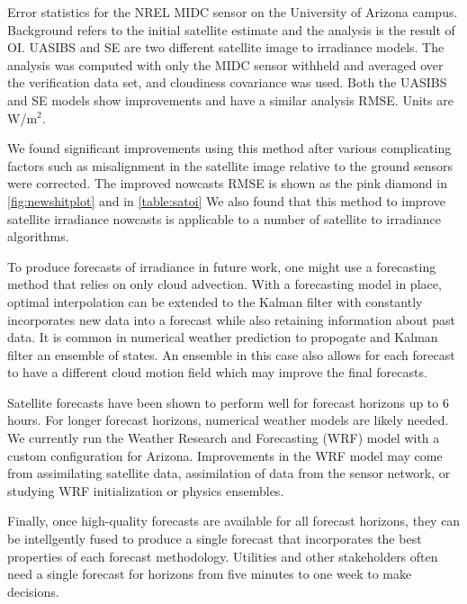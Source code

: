 \begin{table}[htbp]
  \caption[Optimal interpolation error metrics]{
    Error statistics for the NREL MIDC sensor on the University
    of Arizona campus. Background refers to the initial satellite
    estimate and the analysis is the result of OI. UASIBS and SE are
    two different satellite image to irradiance models.
    The analysis was computed with only the MIDC
    sensor withheld and averaged over the verification data set, and
    cloudiness covariance was used. Both the
    UASIBS and SE models show improvements and have a similar
    analysis RMSE\@. Units are W/m$^2$.}
\label{table:satoi}
\vspace{0.5em}

\centering
\end{table}


We found significant improvements using this method after various
complicating factors such as misalignment in the satellite image
relative to the ground sensors were corrected.
The improved nowcasts RMSE is shown as the pink diamond in
\cref{fig:newshitplot} and in \cref{table:satoi}
We also found that this method to improve satellite irradiance
nowcasts is applicable to a number of satellite to irradiance
algorithms.

To produce forecasts of irradiance in future work, one might use a
forecasting method that relies on only cloud advection.
With a forecasting model in place, optimal interpolation can be
extended to the Kalman filter with constantly incorporates new data
into a forecast while also retaining information about past data.
It is common in numerical weather prediction to propogate and Kalman
filter  an ensemble of states.
An ensemble in this case also allows for each forecast to have a
different cloud motion field which may improve the final forecasts.

Satellite forecasts have been shown to perform well for forecast
horizons up to 6 hours.
For longer forecast horizons, numerical weather models are likely
needed.
We currently run the Weather Research and Forecasting (WRF) model with
a custom configuration for Arizona.
Improvements in the WRF model may come from assimilating satellite
data, assimilation of data from the sensor network, or studying WRF
initialization or physics ensembles.

Finally, once high-quality forecasts are available for all forecast
horizons, they can be intellgently fused to produce a single forecast
that incorporates the best properties of each forecast methodology.
Utilities and other stakeholders often need a single forecast for
horizons from five minutes to one week to make decisions.


